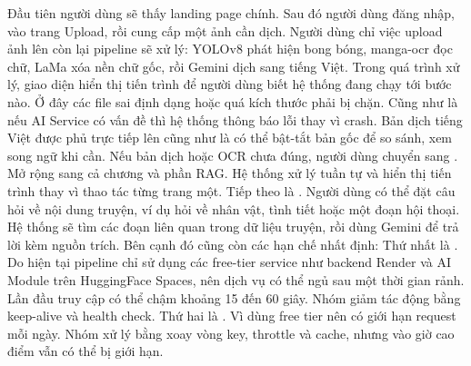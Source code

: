 {}Đầu tiên người dùng sẽ thấy landing page chính. Sau đó người dùng đăng nhập, vào trang Upload, rồi cung cấp một ảnh cần dịch.\markdownRendererParagraphSeparator
{}Người dùng chỉ việc upload ảnh lên còn lại pipeline sẽ xử lý: YOLOv8 phát hiện bong bóng, manga-ocr đọc chữ, LaMa xóa nền chữ gốc, rồi Gemini dịch sang tiếng Việt. Trong quá trình xử lý, giao diện hiển thị tiến trình để người dùng biết hệ thống đang chạy tới bước nào.\markdownRendererParagraphSeparator
{}Ở đây các file sai định dạng hoặc quá kích thước phải bị chặn. Cũng như là nếu AI Service có vấn đề thì hệ thống thông báo lỗi thay vì crash.\markdownRendererInterblockSeparator
{}
\markdownRendererSectionEnd \markdownRendererSectionBegin
{}\markdownRendererInterblockSeparator
{}Bản dịch tiếng Việt được phủ trực tiếp lên cũng như là có thể bật-tắt bản gốc để so sánh, xem song ngữ khi cần.\markdownRendererParagraphSeparator
{}Nếu bản dịch hoặc OCR chưa đúng, người dùng chuyển sang .\markdownRendererInterblockSeparator
{}
\markdownRendererSectionEnd \markdownRendererSectionBegin
{}\markdownRendererInterblockSeparator
{}Mở rộng sang cả chương và phần RAG.\markdownRendererParagraphSeparator
{}Hệ thống xử lý tuần tự và hiển thị tiến trình thay vì thao tác từng trang một.\markdownRendererParagraphSeparator
{}Tiếp theo là . Người dùng có thể đặt câu hỏi về nội dung truyện, ví dụ hỏi về nhân vật, tình tiết hoặc một đoạn hội thoại. Hệ thống sẽ tìm các đoạn liên quan trong dữ liệu truyện, rồi dùng Gemini để trả lời kèm nguồn trích.\markdownRendererInterblockSeparator
{}
\markdownRendererSectionEnd \markdownRendererSectionBegin
{}\markdownRendererInterblockSeparator
{}Bên cạnh đó cũng còn các hạn chế nhất định:\markdownRendererParagraphSeparator
{}Thứ nhất là . Do hiện tại pipeline chỉ sử dụng các free-tier service như backend Render và AI Module trên HuggingFace Spaces, nên dịch vụ có thể ngủ sau một thời gian rảnh. Lần đầu truy cập có thể chậm khoảng 15 đến 60 giây. Nhóm giảm tác động bằng keep-alive và health check.\markdownRendererParagraphSeparator
{}Thứ hai là . Vì dùng free tier nên có giới hạn request mỗi ngày. Nhóm xử lý bằng xoay vòng key, throttle và cache, nhưng vào giờ cao điểm vẫn có thể bị giới hạn.\markdownRendererParagraphSeparator
